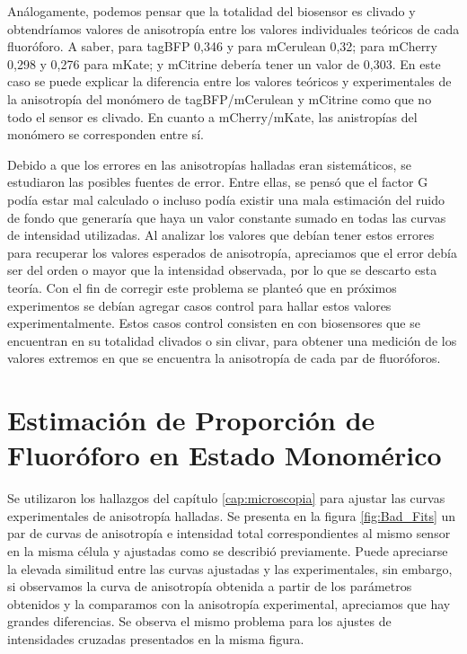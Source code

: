 Análogamente, podemos pensar que la totalidad del biosensor es clivado y obtendríamos valores de anisotropía entre los valores individuales teóricos de cada fluoróforo. A saber, para tagBFP 0,346 y para mCerulean 0,32; para mCherry 0,298 y 0,276 para mKate; y mCitrine debería tener un valor de 0,303. En este caso se puede explicar la diferencia entre los valores teóricos y experimentales de la anisotropía del monómero de tagBFP/mCerulean y mCitrine como que no todo el sensor es clivado. En cuanto a mCherry/mKate, las anistropías del monómero se corresponden entre sí.

Debido a que los errores en las anisotropías halladas eran sistemáticos, se estudiaron las posibles fuentes de error. Entre ellas, se pensó que el factor G podía estar mal calculado o incluso podía existir una mala estimación del ruido de fondo que generaría que haya un valor constante sumado en todas las curvas de intensidad utilizadas. Al analizar los valores que debían tener estos errores para recuperar los valores esperados de anisotropía, apreciamos que el error debía ser del orden o mayor que la intensidad observada, por lo que se descarto esta teoría. Con el fin de corregir este problema se planteó que en próximos experimentos se debían agregar casos control para hallar estos valores experimentalmente. Estos casos control consisten en  con biosensores que se encuentran en su totalidad clivados o sin clivar, para obtener una medición de los valores extremos en que se encuentra la anisotropía de cada par de fluoróforos.




\section{Estimación de Proporción de Fluoróforo en Estado Monomérico}

Se utilizaron los hallazgos del capítulo \ref{cap:microscopia} para ajustar las curvas experimentales de anisotropía halladas. Se presenta en la figura \ref{fig:Bad_Fits} un par de curvas de anisotropía e intensidad total correspondientes al mismo sensor en la misma célula y ajustadas como se describió previamente. Puede apreciarse la elevada similitud entre las curvas ajustadas y las experimentales, sin embargo, si observamos la curva de anisotropía obtenida a partir de los parámetros obtenidos y la comparamos con la anisotropía experimental, apreciamos que hay grandes diferencias. Se observa el mismo problema para los ajustes de intensidades cruzadas presentados en la misma figura.

